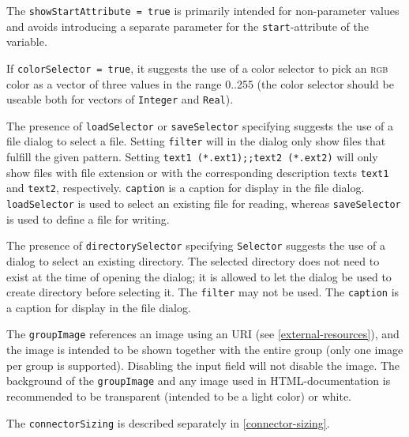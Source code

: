 \begin{nonnormative}
The \lstinline!showStartAttribute = true! is primarily intended for non-parameter values and avoids introducing a separate parameter for the \lstinline!start!-attribute of the variable.
\end{nonnormative}

If \lstinline!colorSelector = true!, it suggests the use of a color selector to pick an \textsc{rgb} color as a vector of three values in the range 0..255 (the color selector should be useable both for vectors of \lstinline!Integer! and \lstinline!Real!).

The presence of \lstinline!loadSelector! or \lstinline!saveSelector! specifying  suggests the use of a file dialog to select a file.
Setting \lstinline!filter! will in the dialog only show files that fulfill the given pattern.
Setting \lstinline!text1 (*.ext1);;text2 (*.ext2)! will only show files with file extension  or  with the corresponding description texts \lstinline!text1! and \lstinline!text2!, respectively.
\lstinline!caption! is a caption for display in the file dialog.
\lstinline!loadSelector! is used to select an existing file for reading, whereas \lstinline!saveSelector! is used to define a file for writing.

The presence of \lstinline!directorySelector! specifying \lstinline!Selector! suggests the use of a dialog to select an existing directory.
The selected directory does not need to exist at the time of opening the dialog; it is allowed to let the dialog be used to create directory before selecting it.
The \lstinline!filter! may not be used.
The \lstinline!caption! is a caption for display in the file dialog.

The \lstinline!groupImage! references an image using an URI (see \cref{external-resources}), and the image is intended to be shown together with the entire group (only one image per group is supported).
Disabling the input field will not disable the image.
The background of the \lstinline!groupImage! and any image used in HTML-documentation is recommended to be transparent (intended to be a light color) or white.

The \lstinline!connectorSizing! is described separately in \cref{connector-sizing}.

